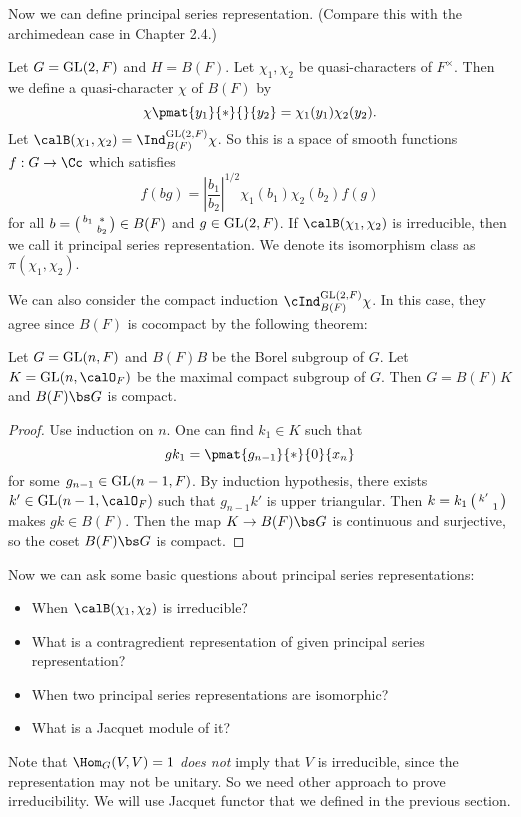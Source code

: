 Now we can define principal series representation. (Compare this with the archimedean case in Chapter 2.4.)
\begin{definition}
Let $G = \mathrm{GL}(2, F)$ and $H = B(F)$. 
Let $\chi_1, \chi_2$ be quasi-characters of $F^{\times}$. 
Then we define a quasi-character $\chi$ of $B(F)$ by 
$$
\chi\pmat{y_1}{*}{}{y_2} = \chi_1(y_1)\chi_2(y_2).
$$
Let $\calB(\chi_1, \chi_2) = \Ind_{B(F)}^{\GL(2, F)} \chi$. 
So this is a space of smooth functions $f:G\to \Cc$ which satisfies 
$$
f(bg) = \left| \frac{b_{1}}{b_{2}}\right|^{1/2} \chi_{1}(b_{1})\chi_{2}(b_{2})f(g)
$$
for all $b = \left(\begin{smallmatrix} b_{1} & * \\  & b_{2} \end{smallmatrix}\right)\in B(F)$ and $g\in \mathrm{GL}(2, F)$. 
If $\calB(\chi_1, \chi_2)$ is irreducible, then we call it principal series representation. We denote its isomorphism class as $\pi(\chi_1, \chi_2)$. 
\end{definition}
We can also consider the compact induction $\cInd_{B(F)}^{\GL(2, F)}\chi$. In this case, they agree since $B(F)$ is cocompact by the following theorem:
\begin{proposition}
Let $G = \mathrm{GL}(n, F)$ and $B(F)B$ be the Borel subgroup of $G$. 
Let $K = \GL(n, \calO_{F})$ be the maximal compact subgroup of $G$. 
Then $G = B(F)K$ and $B(F)\bs G$ is compact. 
\end{proposition}
\begin{proof}
Use induction on $n$. One can find $k_1\in K$ such that 
$$
gk_{1} =\pmat{g_{n-1}}{*}{0}{x_{n}}
$$
for some $g_{n-1}\in \mathrm{GL}(n-1, F)$. By induction hypothesis, there exists $k'\in \GL(n-1, \calO_F)$ such that $g_{n-1}k'$ is upper triangular. Then $k = k_1 \left(\begin{smallmatrix} k' &  \\  & 1 \end{smallmatrix}\right)$ makes $gk \in B(F)$. 
Then the map $K \to B(F)\bs G$ is continuous and surjective, so the coset $B(F)\bs G$ is compact. 
\end{proof}

Now we can ask some basic questions about principal series representations: 
\begin{itemize}
\item When $\calB(\chi_{1}, \chi_2)$ is irreducible?
\item What is a contragredient representation of given principal series representation?
\item When two principal series representations are isomorphic?
\item What is a Jacquet module of it?
\end{itemize}

Note that $\Hom_G(V, V) =1$ \emph{does not} imply that $V$ is irreducible, since the representation may not be unitary. So we need other approach to prove irreducibility. 
We will use Jacquet functor that we defined in the previous section. 


